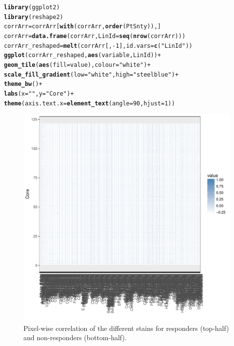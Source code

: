 \documentclass[a4paper]{article}\usepackage[]{graphicx}\usepackage[]{color}
\makeatletter
\def\maxwidth{ %
  \ifdim\Gin@nat@width>\linewidth
    \linewidth
  \else
    \Gin@nat@width
  \fi
}
\newcommand{\hlnum}[1]{\textcolor[rgb]{0.686,0.059,0.569}{#1}}%
\newcommand{\hlstr}[1]{\textcolor[rgb]{0.192,0.494,0.8}{#1}}%
\newcommand{\hlopt}[1]{\textcolor[rgb]{0,0,0}{#1}}%
\newcommand{\hlstd}[1]{\textcolor[rgb]{0.345,0.345,0.345}{#1}}%
\newcommand{\hlkwb}[1]{\textcolor[rgb]{0.69,0.353,0.396}{#1}}%
\newcommand{\hlkwc}[1]{\textcolor[rgb]{0.333,0.667,0.333}{#1}}%
\newcommand{\hlkwd}[1]{\textcolor[rgb]{0.737,0.353,0.396}{\textbf{#1}}}%
\newenvironment{kframe}{%
 \def\at@end@of@kframe{}%
 \ifinner\ifhmode%
  \def\at@end@of@kframe{\end{minipage}}%
  \begin{minipage}{\columnwidth}%
 \fi\fi%
 \def\FrameCommand##1{\hskip\@totalleftmargin \hskip-\fboxsep
 \colorbox{shadecolor}{##1}\hskip-\fboxsep
     \hskip-\linewidth \hskip-\@totalleftmargin \hskip\columnwidth}%
 \MakeFramed {\advance\hsize-\width
   \@totalleftmargin\z@ \linewidth\hsize
   \@setminipage}}%
 {\par\unskip\endMakeFramed%
 \at@end@of@kframe}
\newenvironment{knitrout}{}{} %
\makeatother
\begin{document}
\begin{knitrout}
\color{fgcolor}\begin{kframe}
\begin{alltt}
\hlkwd{library}\hlstd{(ggplot2)}
\hlkwd{library}\hlstd{(reshape2)}
\hlstd{corrArr} \hlkwb{=} \hlstd{corrArr[}\hlkwd{with}\hlstd{(corrArr,} \hlkwd{order}\hlstd{(PtSnty)), ]}
\hlstd{corrArr} \hlkwb{=} \hlkwd{data.frame}\hlstd{(corrArr,}\hlkwc{LinId}\hlstd{=}\hlkwd{seq}\hlstd{(}\hlkwd{nrow}\hlstd{(corrArr)))}
\hlstd{corrArr_reshaped} \hlkwb{=} \hlkwd{melt}\hlstd{(corrArr[,}\hlopt{-}\hlnum{1}\hlstd{],}\hlkwc{id.vars}\hlstd{=}\hlkwd{c}\hlstd{(}\hlstr{"LinId"}\hlstd{))}
\hlkwd{ggplot}\hlstd{(corrArr_reshaped,} \hlkwd{aes}\hlstd{(variable, LinId))} \hlopt{+}
  \hlkwd{geom_tile}\hlstd{(}\hlkwd{aes}\hlstd{(}\hlkwc{fill} \hlstd{= value),}\hlkwc{colour}\hlstd{=}\hlstr{"white"}\hlstd{)} \hlopt{+}
  \hlkwd{scale_fill_gradient}\hlstd{(}\hlkwc{low}\hlstd{=}\hlstr{"white"}\hlstd{,}\hlkwc{high}\hlstd{=}\hlstr{"steelblue"}\hlstd{)} \hlopt{+}
  \hlkwd{theme_bw}\hlstd{()} \hlopt{+}
  \hlkwd{labs}\hlstd{(}\hlkwc{x}\hlstd{=}\hlstr{""}\hlstd{,}\hlkwc{y}\hlstd{=}\hlstr{"Core"}\hlstd{)} \hlopt{+}
  \hlkwd{theme}\hlstd{(}\hlkwc{axis.text.x} \hlstd{=} \hlkwd{element_text}\hlstd{(}\hlkwc{angle}\hlstd{=}\hlnum{90}\hlstd{,} \hlkwc{hjust}\hlstd{=}\hlnum{1}\hlstd{))}
\end{alltt}
\end{kframe}\begin{figure}[h]
\includegraphics[width=\maxwidth]{figure/Fig_CorrMatrices-1} \caption[Pixel-wise correlation of the different stains for responders (top-half) and non-responders (bottom-half)]{Pixel-wise correlation of the different stains for responders (top-half) and non-responders (bottom-half).}\label{fig:Fig_CorrMatrices}
\end{figure}


\end{knitrout}
  
\end{document}
